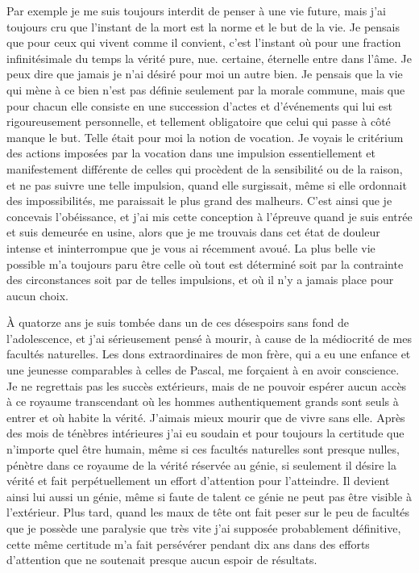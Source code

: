 \documentclass[french,twoside]{book} %
\begin{document}
Par exemple je me suis toujours interdit de penser à une vie future, mais j'ai toujours cru que l'instant de la mort est la norme et le but de la vie. Je pensais que pour ceux qui vivent comme il convient, c'est l'instant où pour une fraction infinitésimale du temps la vérité pure, nue. certaine, éternelle entre dans l'âme. Je peux dire que jamais je n'ai désiré pour moi un autre bien. Je pensais que la vie qui mène à ce bien n'est pas définie seulement par la morale commune, mais que pour chacun elle consiste en une succession d'actes et d'événements qui lui est rigoureusement personnelle, et tellement obligatoire que celui qui passe à côté manque le but. Telle était pour moi la notion de vocation. Je voyais le critérium des actions imposées par la vocation dans une impulsion essentiellement et manifestement différente de celles qui procèdent de la sensibilité ou de la raison, et ne pas suivre une telle impulsion, quand elle surgissait, même si elle ordonnait des impossibilités, me paraissait le plus grand des malheurs. C'est ainsi que je concevais l'obéissance, et j'ai mis cette conception à l'épreuve quand je suis entrée et suis demeurée en usine, alors que je me trouvais dans cet état de douleur intense et ininterrompue que je vous ai récemment avoué. La plus belle vie possible m'a toujours paru être celle où tout est déterminé soit par la contrainte des circonstances soit par de telles impulsions, et où il n'y a jamais place pour aucun choix.\par
À quatorze ans je suis tombée dans un de ces désespoirs sans fond de l'adolescence, et j'ai sérieusement pensé à mourir, à cause de la médiocrité de mes facultés naturelles. Les dons extraordinaires de mon frère, qui a eu une enfance et une jeunesse comparables à celles de Pascal, me forçaient à en avoir conscience. Je ne regrettais pas les succès extérieurs, mais de ne pouvoir espérer aucun accès à ce royaume transcendant où les hommes authentiquement grands sont seuls à entrer et où habite la vérité. J'aimais mieux mourir que de vivre sans elle. Après des mois de ténèbres intérieures j'ai eu soudain et pour toujours la certitude que n'importe quel être humain, même si ces facultés naturelles sont presque nulles, pénètre dans ce royaume de la vérité réservée au génie, si seulement il désire la vérité et fait perpétuellement un effort d'attention pour l'atteindre. Il devient ainsi lui aussi un génie, même si faute de talent ce génie ne peut pas être visible à l'extérieur. Plus tard, quand les maux de tête ont fait peser sur le peu de facultés que je possède une paralysie que très vite j'ai supposée probablement définitive, cette même certitude m'a fait persévérer pendant dix ans dans des efforts d'attention que ne soutenait presque aucun espoir de résultats.\par
\end{document}
